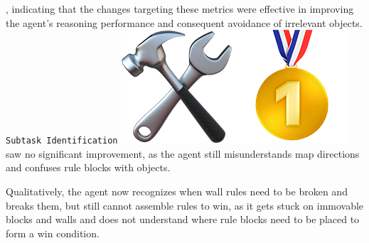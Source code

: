 , indicating that the changes targeting these metrics were effective in improving
the agent's reasoning performance and consequent avoidance of irrelevant objects.
\texttt{Subtask Identification}
\includegraphics[scale=0.07]{figs/emojis/emoji_5.png}
saw no significant improvement, as the agent still misunderstands map directions
and confuses rule blocks with objects.

Qualitatively, the agent now recognizes when wall rules need to be broken and breaks
them, but still cannot assemble rules to win, as it gets stuck on immovable blocks
and walls and does not understand where rule blocks need to be placed to form a win
condition.

